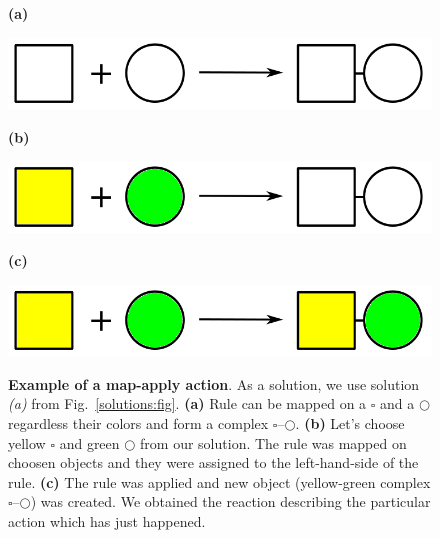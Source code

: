 \documentclass[12pt]{fithesis2}
\begin{document}
\begin{figure}
\begin{center}
\begin{minipage}[l]{0.1\textwidth}
    \textbf{(a)}
  \end{minipage}
  \begin{minipage}[r]{0.6\textwidth}
    {\hspace*{1.3cm}\includegraphics[scale=0.2]{rule_complex}}
\end{minipage}

\begin{minipage}[l]{0.1\textwidth}
    \textbf{(b)}
  \end{minipage}
  \begin{minipage}[r]{0.6\textwidth}
    {\hspace*{1.3cm}\includegraphics[scale=0.2]{rule_complex_mapped}}
\end{minipage}

\begin{minipage}[l]{0.1\textwidth}
    \textbf{(c)}
  \end{minipage}
  \begin{minipage}[r]{0.6\textwidth}
    {\hspace*{1.3cm}\includegraphics[scale=0.2]{rule_reaction}}
\end{minipage}
\caption{\textbf{Example of a map-apply action}. As a solution, we use solution \textit{(a)} from Fig.~\ref{solutions:fig}. \textbf{(a)} Rule can be mapped on a $\square$ and a $\bigcirc$ regardless their colors and form a complex $\square$--$\bigcirc$.  \textbf{(b)} Let's choose yellow $\square$ and green $\bigcirc$ from our solution. The rule was mapped on choosen objects and they were assigned to the left-hand-side of the rule. \textbf{(c)} The rule was applied and new object (yellow-green complex $\square$--$\bigcirc$) was created. We obtained the reaction describing the particular action which has just happened.}
\label{map-apply:fig}
\end{center}
\end{figure}
\end{document}
